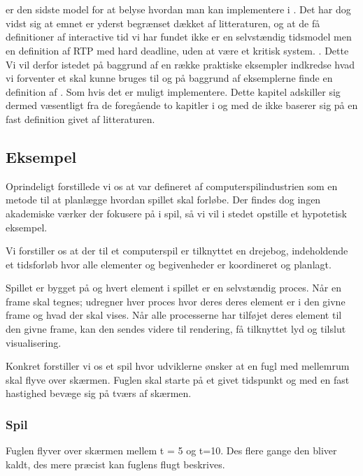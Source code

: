 \chapter{\is}
\label{chap:is}

\is er den sidste model for at belyse hvordan man kan implementere i \pycsp. Det har dog vidst sig at emnet er yderst begrænset dækket af litteraturen, og at de få definitioner af interactive tid vi har fundet ikke er en selvstændig tidsmodel men en definition af RTP med hard deadline, uden at være et kritisk system. \cite{?}. Dette Vi vil derfor istedet på baggrund af en række praktiske eksempler indkredse hvad vi forventer et \is skal kunne bruges til og på  baggrund af eksemplerne finde en definition af \is. Som hvis det er muligt implementere. Dette kapitel adskiller sig dermed væsentligt fra de foregående to kapitler i og med de ikke baserer sig på en fast definition givet af litteraturen. 

\section{Eksempel}
Oprindeligt forstillede vi os at \is var defineret af computerspilindustrien som en metode til at planlægge hvordan spillet skal forløbe. Der findes dog ingen akademiske værker der fokusere på \is i spil, så vi vil i stedet opstille et hypotetisk eksempel. 

Vi forstiller os at der til et computerspil er tilknyttet en drejebog, indeholdende et tidsforløb hvor alle elementer og begivenheder er koordineret og planlagt. 

Spillet er bygget på \pycsp og hvert element i spillet er en selvstændig proces. Når en frame skal tegnes; udregner hver proces hvor deres deres element er i den givne frame og hvad der skal vises. Når alle processerne har tilføjet deres element til den givne frame, kan den sendes videre til rendering, få tilknyttet lyd og tilslut visualisering. 

Konkret forstiller vi os et spil hvor udviklerne ønsker at en fugl med mellemrum skal flyve over skærmen. Fuglen skal starte på et givet tidspunkt og med en fast hastighed bevæge sig på tværs af skærmen.




\subsection*{Spil}
Fuglen flyver over skærmen mellem t = 5 og t=10. Des flere gange den bliver kaldt, des mere præcist kan fuglens flugt beskrives.
